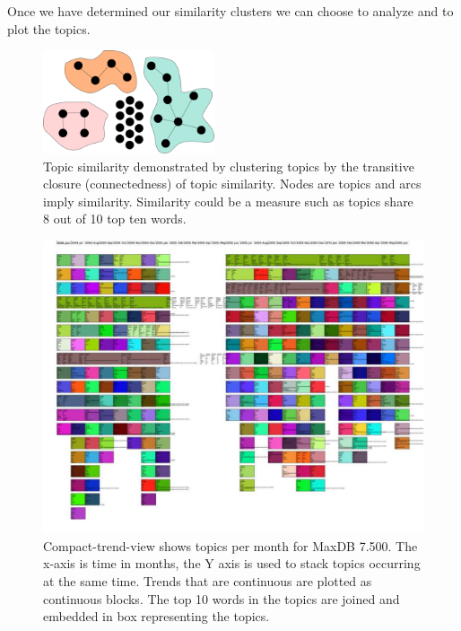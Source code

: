 \documentclass[times, 10pt,twocolumn]{article}
\begin{document}
Once we have determined our similarity clusters we can choose to
analyze and to plot the topics.

\begin{figure}[t]
  \centering
  \includegraphics[width=0.45\textwidth]{transitiveclosure}
  \caption{Topic similarity demonstrated by clustering topics by the transitive closure (connectedness)
    of topic similarity. Nodes are topics and
    arcs imply similarity. Similarity could be a measure such as
    topics share 8 out of 10 top ten words.}
\label{fig:closure}
\end{figure}


\begin{figure}
  \centering
  \includegraphics[width=1.0\textwidth]{fixed-time-smear-plot-scaled}
  \caption{Compact-trend-view shows topics per month for MaxDB
    7.500. The x-axis is time in months, the Y axis is used to stack
    topics occurring at the same time. Trends that are continuous are
    plotted as continuous blocks. The top 10 words in the topics are
    joined and embedded in box representing the topics.}
  \label{fig:topicsmear}
\end{figure}
\end{document}
